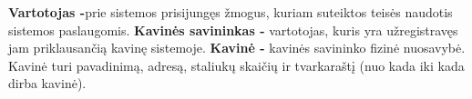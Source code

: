 \documentclass{VUMIFPSkursinis}
\begin{document}
\noindent
\textbf{Vartotojas -}prie sistemos prisijungęs žmogus, kuriam suteiktos teisės naudotis sistemos
paslaugomis.
\newline
\textbf{Kavinės savininkas -} vartotojas, kuris yra užregistravęs jam priklausančią kavinę sistemoje.
\newline
\textbf{Kavinė -} kavinės savininko fizinė nuosavybė. Kavinė turi pavadinimą, adresą, staliukų skaičių ir tvarkaraštį (nuo kada iki kada dirba kavinė).
\newline
\end{document}
